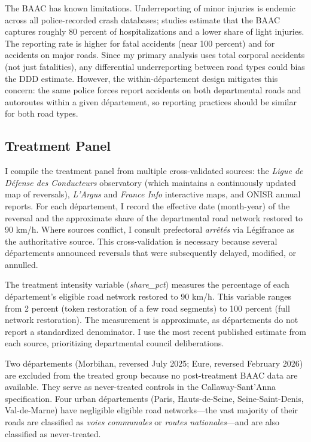\documentclass[12pt]{article}
\begin{document}
The BAAC has known limitations. Underreporting of minor injuries is endemic across all police-recorded crash databases; studies estimate that the BAAC captures roughly 80 percent of hospitalizations and a lower share of light injuries. The reporting rate is higher for fatal accidents (near 100 percent) and for accidents on major roads. Since my primary analysis uses total corporal accidents (not just fatalities), any differential underreporting between road types could bias the DDD estimate. However, the within-d\'{e}partement design mitigates this concern: the same police forces report accidents on both departmental roads and autoroutes within a given d\'{e}partement, so reporting practices should be similar for both road types.

\subsection{Treatment Panel}

I compile the treatment panel from multiple cross-validated sources: the \textit{Ligue de D\'{e}fense des Conducteurs} observatory (which maintains a continuously updated map of reversals), \textit{L'Argus} and \textit{France Info} interactive maps, and ONISR annual reports. For each d\'{e}partement, I record the effective date (month-year) of the reversal and the approximate share of the departmental road network restored to 90 km/h. Where sources conflict, I consult prefectoral \textit{arr\^{e}t\'{e}s} via L\'{e}gifrance as the authoritative source. This cross-validation is necessary because several d\'{e}partements announced reversals that were subsequently delayed, modified, or annulled.

The treatment intensity variable (\textit{share\_pct}) measures the percentage of each d\'{e}partement's eligible road network restored to 90 km/h. This variable ranges from 2 percent (token restoration of a few road segments) to 100 percent (full network restoration). The measurement is approximate, as d\'{e}partements do not report a standardized denominator. I use the most recent published estimate from each source, prioritizing departmental council deliberations.

Two d\'{e}partements (Morbihan, reversed July 2025; Eure, reversed February 2026) are excluded from the treated group because no post-treatment BAAC data are available. They serve as never-treated controls in the Callaway-Sant'Anna specification. Four urban d\'{e}partements (Paris, Hauts-de-Seine, Seine-Saint-Denis, Val-de-Marne) have negligible eligible road networks---the vast majority of their roads are classified as \textit{voies communales} or \textit{routes nationales}---and are also classified as never-treated.
\end{document}
